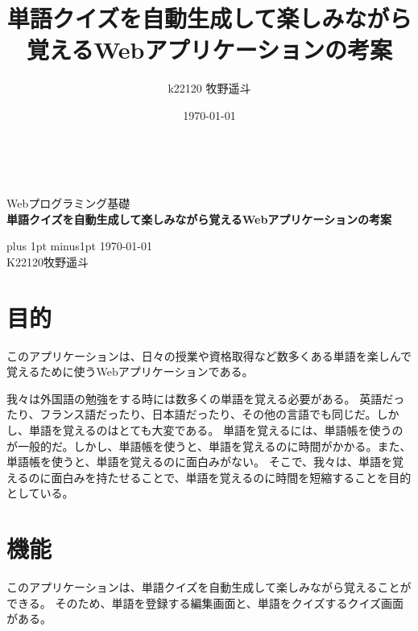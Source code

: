\documentclass[11pt,a4paper]{jsarticle}
\title{単語クイズを自動生成して楽しみながら覚えるWebアプリケーションの考案}
\author{k22120 牧野遥斗}
\date{\today}
\begin{document}
\begin{titlepage}
    \begin{center}

        \ \vspace{19mm}

        \LARGE\baselineskip=13mm
        Webプログラミング基礎\\[1mm]
        {\Huge\baselineskip=13mm
        \textbf{単語クイズを自動生成して楽しみながら覚えるWebアプリケーションの考案} \\
        }

        \vspace{80mm}

        \kanjiskip=9pt plus 1pt minus1pt
        \today \\
        K22120\hspace{1zw}牧野遥斗 \\
    \end{center}
\end{titlepage}

\section{目的}
このアプリケーションは、日々の授業や資格取得など数多くある単語を楽しんで覚えるために使うWebアプリケーションである。

我々は外国語の勉強をする時には数多くの単語を覚える必要がある。
英語だったり、フランス語だったり、日本語だったり、その他の言語でも同じだ。しかし、単語を覚えるのはとても大変である。
単語を覚えるには、単語帳を使うのが一般的だ。しかし、単語帳を使うと、単語を覚えるのに時間がかかる。また、単語帳を使うと、単語を覚えるのに面白みがない。
そこで、我々は、単語を覚えるのに面白みを持たせることで、単語を覚えるのに時間を短縮することを目的としている。

\section{機能}
このアプリケーションは、単語クイズを自動生成して楽しみながら覚えることができる。
そのため、単語を登録する編集画面と、単語をクイズするクイズ画面がある。
\end{document}
